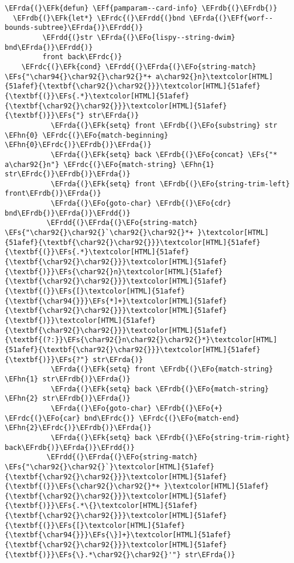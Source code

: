 \documentclass[a4wide,10pt]{article}
\newcommand{\EFs}[1]{\textcolor{EFs}{#1}} %
\newcommand{\EFk}[1]{\textcolor{EFk}{#1}} %
\newcommand{\EFf}[1]{\textcolor{EFf}{#1}} %
\newcommand{\EFo}[1]{\textcolor{EFo}{#1}} %
\newcommand{\EFhn}[1]{\textcolor{EFhn}{\textbf{#1}}} %
\newcommand{\EFrda}[1]{\textcolor{EFrda}{#1}} %
\newcommand{\EFrdb}[1]{\textcolor{EFrdb}{#1}} %
\newcommand{\EFrdc}[1]{\textcolor{EFrdc}{#1}} %
\newcommand{\EFrdd}[1]{\textcolor{EFrdd}{#1}} %
\begin{document}
\begin{Code}
\begin{Verbatim}
\EFrda{(}\EFk{defun} \EFf{pamparam--card-info} \EFrdb{(}\EFrdb{)}
  \EFrdb{(}\EFk{let*} \EFrdc{(}\EFrdd{(}bnd \EFrda{(}\EFf{worf--bounds-subtree}\EFrda{)}\EFrdd{)}
         \EFrdd{(}str \EFrda{(}\EFo{lispy--string-dwim} bnd\EFrda{)}\EFrdd{)}
         front back\EFrdc{)}
    \EFrdc{(}\EFk{cond} \EFrdd{(}\EFrda{(}\EFo{string-match} \EFs{"\char94{}\char92{}\char92{}*+ a\char92{}n}\textcolor[HTML]{51afef}{\textbf{\char92{}\char92{}}}\textcolor[HTML]{51afef}{\textbf{(}}\EFs{.*}\textcolor[HTML]{51afef}{\textbf{\char92{}\char92{}}}\textcolor[HTML]{51afef}{\textbf{)}}\EFs{"} str\EFrda{)}
           \EFrda{(}\EFk{setq} front \EFrdb{(}\EFo{substring} str \EFhn{0} \EFrdc{(}\EFo{match-beginning} \EFhn{0}\EFrdc{)}\EFrdb{)}\EFrda{)}
           \EFrda{(}\EFk{setq} back \EFrdb{(}\EFo{concat} \EFs{"* a\char92{}n"} \EFrdc{(}\EFo{match-string} \EFhn{1} str\EFrdc{)}\EFrdb{)}\EFrda{)}
           \EFrda{(}\EFk{setq} front \EFrdb{(}\EFo{string-trim-left} front\EFrdb{)}\EFrda{)}
           \EFrda{(}\EFo{goto-char} \EFrdb{(}\EFo{cdr} bnd\EFrdb{)}\EFrda{)}\EFrdd{)}
          \EFrdd{(}\EFrda{(}\EFo{string-match} \EFs{"\char92{}\char92{}`\char92{}\char92{}*+ }\textcolor[HTML]{51afef}{\textbf{\char92{}\char92{}}}\textcolor[HTML]{51afef}{\textbf{(}}\EFs{.*}\textcolor[HTML]{51afef}{\textbf{\char92{}\char92{}}}\textcolor[HTML]{51afef}{\textbf{)}}\EFs{\char92{}n}\textcolor[HTML]{51afef}{\textbf{\char92{}\char92{}}}\textcolor[HTML]{51afef}{\textbf{(}}\EFs{[}\textcolor[HTML]{51afef}{\textbf{\char94{}}}\EFs{*]+}\textcolor[HTML]{51afef}{\textbf{\char92{}\char92{}}}\textcolor[HTML]{51afef}{\textbf{)}}\textcolor[HTML]{51afef}{\textbf{\char92{}\char92{}}}\textcolor[HTML]{51afef}{\textbf{(?:}}\EFs{\char92{}n\char92{}\char92{}*}\textcolor[HTML]{51afef}{\textbf{\char92{}\char92{}}}\textcolor[HTML]{51afef}{\textbf{)}}\EFs{?"} str\EFrda{)}
           \EFrda{(}\EFk{setq} front \EFrdb{(}\EFo{match-string} \EFhn{1} str\EFrdb{)}\EFrda{)}
           \EFrda{(}\EFk{setq} back \EFrdb{(}\EFo{match-string} \EFhn{2} str\EFrdb{)}\EFrda{)}
           \EFrda{(}\EFo{goto-char} \EFrdb{(}\EFo{+} \EFrdc{(}\EFo{car} bnd\EFrdc{)} \EFrdc{(}\EFo{match-end} \EFhn{2}\EFrdc{)}\EFrdb{)}\EFrda{)}
           \EFrda{(}\EFk{setq} back \EFrdb{(}\EFo{string-trim-right} back\EFrdb{)}\EFrda{)}\EFrdd{)}
          \EFrdd{(}\EFrda{(}\EFo{string-match} \EFs{"\char92{}\char92{}`}\textcolor[HTML]{51afef}{\textbf{\char92{}\char92{}}}\textcolor[HTML]{51afef}{\textbf{(}}\EFs{\char92{}\char92{}*+ }\textcolor[HTML]{51afef}{\textbf{\char92{}\char92{}}}\textcolor[HTML]{51afef}{\textbf{)}}\EFs{.*\{}\textcolor[HTML]{51afef}{\textbf{\char92{}\char92{}}}\textcolor[HTML]{51afef}{\textbf{(}}\EFs{[}\textcolor[HTML]{51afef}{\textbf{\char94{}}}\EFs{\}]+}\textcolor[HTML]{51afef}{\textbf{\char92{}\char92{}}}\textcolor[HTML]{51afef}{\textbf{)}}\EFs{\}.*\char92{}\char92{}'"} str\EFrda{)}

\end{Verbatim}
\end{Code}
\end{document}
